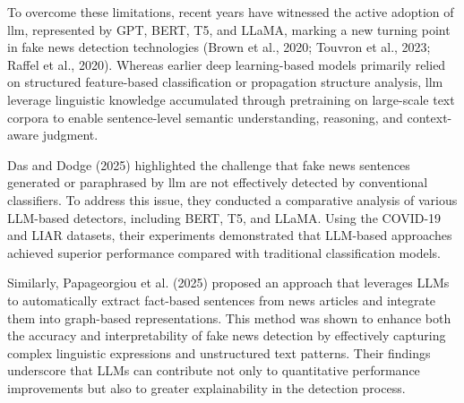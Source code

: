 \documentclass[a4paper,fleqn]{cas-sc}
\begin{document}
To overcome these limitations, recent years have witnessed the active adoption of \gls{llm}, represented by GPT, BERT, T5, and LLaMA, marking a new turning point in fake news detection technologies (Brown et al., 2020; Touvron et al., 2023; Raffel et al., 2020). Whereas earlier deep learning-based models primarily relied on structured feature-based classification or propagation structure analysis, \gls{llm} leverage linguistic knowledge accumulated through pretraining on large-scale text corpora to enable sentence-level semantic understanding, reasoning, and context-aware judgment.

Das and Dodge (2025) highlighted the challenge that fake news sentences generated or paraphrased by \gls{llm} are not effectively detected by conventional classifiers. To address this issue, they conducted a comparative analysis of various LLM-based detectors, including BERT, T5, and LLaMA. Using the COVID-19 and LIAR datasets, their experiments demonstrated that LLM-based approaches achieved superior performance compared with traditional classification models.

Similarly, Papageorgiou et al. (2025) proposed an approach that leverages LLMs to automatically extract fact-based sentences from news articles and integrate them into graph-based representations. This method was shown to enhance both the accuracy and interpretability of fake news detection by effectively capturing complex linguistic expressions and unstructured text patterns. Their findings underscore that LLMs can contribute not only to quantitative performance improvements but also to greater explainability in the detection process.
\end{document}
